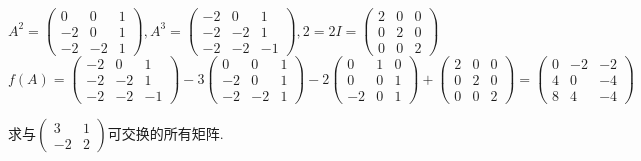 \begin{solution}
    $A^2=\begin{pmatrix}0&0&1\\-2&0&1\\-2&-2&1\end{pmatrix},A^3=\begin{pmatrix}-2&0&1\\-2&-2&1\\-2&-2&-1\end{pmatrix},2=2I=\begin{pmatrix}2&0&0\\0&2&0\\0&0&2\end{pmatrix}$\\
    $f(A)=\begin{pmatrix}-2&0&1\\-2&-2&1\\-2&-2&-1\end{pmatrix}-3\begin{pmatrix}0&0&1\\-2&0&1\\-2&-2&1\end{pmatrix}-2\begin{pmatrix}0&1&0\\0&0&1\\-2&0&1\end{pmatrix}+\begin{pmatrix}2&0&0\\0&2&0\\0&0&2\end{pmatrix}=\begin{pmatrix}0&-2&-2\\4&0&-4\\8&4&-4\end{pmatrix}$
\end{solution}
\begin{example}{}{}
    求与$\begin{pmatrix}3&1\\-2&2\end{pmatrix}$可交换的所有矩阵.
\end{example}
